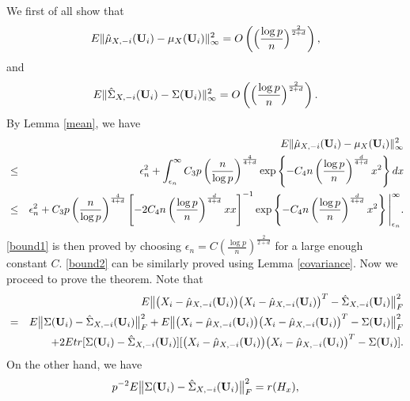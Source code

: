 \documentclass[11pt]{article}
\theoremstyle{definition}
\begin{document}
 We first of all show that 
 \begin{eqnarray}\label{bound1}
 	E\|\hat{\mu}_{X,-i}({\bf U}_i)-{\mu}_X({\bf U}_i)\|_\infty^2= O\left(\Big(\frac{\log p}{n}\Big)^{\frac{2}{2+d}}\right),
 \end{eqnarray}
 and 
 \begin{eqnarray}\label{bound2}
 	E\|\hat{\Sigma}_{X,-i}({\bf U}_i)-{\Sigma}({\bf U}_i)\|_\infty^2= O\left(\Big(\frac{\log p}{n}\Big)^{\frac{2}{2+d}}\right).
 \end{eqnarray}
 By Lemma \ref{mean},  we have
 \begin{eqnarray*}
 	&&	E\|\hat{\mu}_{X,-i}({\bf U}_i)-{\mu}_X({\bf U}_i)\|_\infty^2\\
 	&\leq& \epsilon_n^2
 	+\int_{\epsilon_n}^\infty C_3p\left(\frac{n}{\log p}\right)^{\frac{4}{4+d}}\exp\left\{-C_4n \left(\frac{\log p}{n}\right)^{\frac{d}{4+d}}x^2\right\}dx\\
 	&\leq&  \epsilon_n^2+ C_3p\left(\frac{n}{\log p}\right)^{\frac{4}{4+d}}
 	\left[ -2C_4n \left(\frac{\log p}{n}\right)^{\frac{d}{4+d}}xx\right]^{-1}
 	\exp\left\{-C_4n \left(\frac{\log p}{n}\right)^{\frac{d}{4+d}}x^2\right\}\Bigg|_{\epsilon_n}^\infty.
 \end{eqnarray*}
 \eqref{bound1} is then proved by choosing $\epsilon_n=C\left(\frac{\log p}{n}\right)^{\frac{2}{2+d}}$ for a large enough constant $C$.
 \eqref{bound2} can be similarly proved using  Lemma \ref{covariance}. Now we proceed to prove the theorem.  
 Note that
 \begin{eqnarray}\label{mise0}
 	&&	E  \big\| \big(X_{i}-\hat{\mu}_{X,-i}({\bf U}_i)\big) \big(X_{i}-\hat{\mu}_{X,-i}({\bf U}_i)\big)^T-\hat{\Sigma}_{X,-i}({\bf U}_i)\big\|_F^2 \\
 	&=&E  \big\| \Sigma({\bf U}_i)-\hat{\Sigma}_{X,-i}({\bf U}_i)\big\|_F^2 +E\big\| \big(X_{i}-\hat{\mu}_{X,-i}({\bf U}_i)\big) \big(X_{i}-\hat{\mu}_{X,-i}({\bf U}_i)\big)^T- \Sigma({\bf U}_i)\big\|_F^2 \nonumber\\
 	&&+2E tr[ \Sigma({\bf U}_i)-\hat{\Sigma}_{X,-i}({\bf U}_i)] 
 	[ \big(X_{i}-\hat{\mu}_{X,-i}({\bf U}_i)\big) \big(X_{i}-\hat{\mu}_{X,-i}({\bf U}_i)\big)^T- \Sigma({\bf U}_i)]. \nonumber
 \end{eqnarray}
 On the other hand, we have
 \begin{eqnarray}\label{mise1}
 	p^{-2}	E  \big\| \Sigma({\bf U}_i)-\hat{\Sigma}_{X,-i}({\bf U}_i)\big\|_F^2 =  r(H_x),
 \end{eqnarray}
\end{document}
